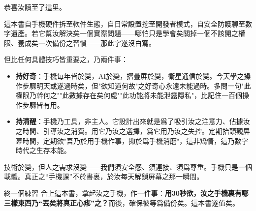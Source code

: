 
恭喜汝讀至了這里。

這本書自手機硬件拆至軟件生態，自日常設置挖至開發者模式，自安全防護聊至數字遺產。若它幫汝解決矣一個實際問題——哪怕只是學會矣關掉一個不該開之權限、養成矣一次備份之習慣——那此字遂沒白寫。

但比任何具體技巧皆重要之，乃兩件事：

\begin{itemize}
  \item \textbf{持好奇}：手機每年皆於變，AI於變，摺疊屏於變，衛星通信於變。今天學之操作步驟明天或遂過時矣，但"欲知道何故"之好奇心永遠未能過時。多問一句"此權限乃幹何之""此數據存在矣何處""此功能將未能泄露隱私"，比記住一百個操作步驟皆有用。
  \item \textbf{持清醒}：手機乃工具，非主人。它設計出來就是爲了吸引汝之注意力、佔據汝之時間、引導汝之消費。用它乃汝之選擇，爲它用乃汝之失控。定期抬頭觀屏幕時間，定期欲"吾乃於用手機作事，抑於爲手機消磨"，這非矯情，這乃數字時代之生存本能。
\end{itemize}

技術於變，但人之需求沒變——我們須安全感、須連接、須爲尊重。手機只是一個載體。真正之“手機課”不於書裏，於汝每天解鎖屏幕之那一瞬間。

\begin{tcbpractice}{終一個練習}
合上這本書，拿起汝之手機，作一件事：\textbf{用30秒欲，汝之手機裏有哪三樣東西乃“丟矣將真正心疼”之？}而後，確保彼等爲備份矣。這本書遂值矣。

\end{tcbpractice}
